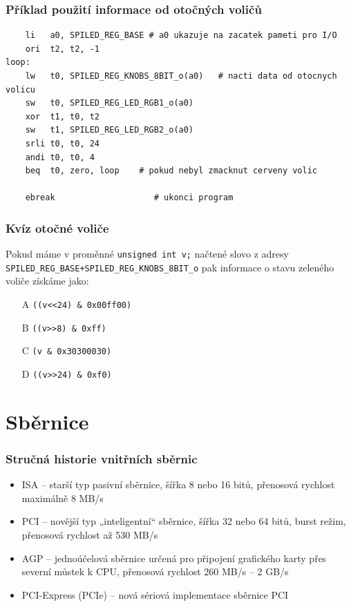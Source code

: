 \documentclass{beamer}
\begin{document}
\begin{frame}[fragile]
\frametitle{Příklad použití informace od otočných voličů}

\begin{verbatim}
    li   a0, SPILED_REG_BASE # a0 ukazuje na zacatek pameti pro I/O
    ori  t2, t2, -1
loop:
    lw   t0, SPILED_REG_KNOBS_8BIT_o(a0)   # nacti data od otocnych volicu
    sw   t0, SPILED_REG_LED_RGB1_o(a0)
    xor  t1, t0, t2
    sw   t1, SPILED_REG_LED_RGB2_o(a0)
    srli t0, t0, 24
    andi t0, t0, 4
    beq  t0, zero, loop    # pokud nebyl zmacknut cerveny volic

    ebreak                    # ukonci program
\end{verbatim}
\end{frame}

\begin{frame}
\frametitle{Kvíz otočné voliče}

Pokud máme v proměnné \texttt{unsigned int v;} načtené slovo z adresy \texttt{SPILED\_REG\_BASE+SPILED\_REG\_KNOBS\_8BIT\_o} pak informace o stavu zeleného voliče získáme jako:
\begin{itemize}
\item[A] \texttt{((v<<24) \& 0x00ff00)}
\item[B] \texttt{((v>>8) \& 0xff)}
\item[C] \texttt{(v \& 0x30300030)}
\item[D] \texttt{((v>>24) \& 0xf0)}
\end{itemize}
\end{frame}

\section{Sběrnice}

\begin{frame}
\frametitle{Stručná historie vnitřních sběrnic}

\begin{itemize}
\item ISA – starší typ pasivní sběrnice, šířka 8 nebo 16 bitů, přenosová rychlost maximálně 8 MB/s
\item PCI – novější typ „inteligentní“ sběrnice, šířka 32 nebo 64 bitů, burst režim, přenosová rychlost až 530 MB/s
\item AGP – jednoúčelová sběrnice určená pro připojení grafického karty přes severní můstek k CPU, přenosová rychlost 260 MB/s – 2 GB/s
\item PCI-Express (PCIe) – nová sériová implementace sběrnice PCI
\end{itemize}
\end{frame}
\end{document}
